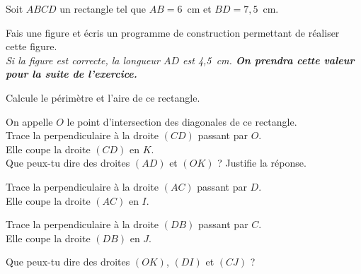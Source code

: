 Soit $ABCD$ un rectangle tel que $AB=6$~cm et $BD=7,5$~cm.
\begin{myenumerate}
\item Fais une figure et écris un programme de construction permettant
de réaliser cette figure.
\\{\em Si la figure est correcte, la longueur $AD$ est {\em 4,5~cm}. \bf
On prendra cette valeur pour la suite de l'exercice.}
\item Calcule le périmètre et l'aire de ce rectangle.
\item On appelle $O$ le point d'intersection des diagonales de ce
rectangle.\\ Trace la perpendiculaire à la droite $(CD)$ passant par
$O$.\\Elle coupe la droite $(CD)$ en $K$.\\ Que peux-tu dire des
droites $(AD)$ et $(OK)$ ? Justifie la réponse.
\item Trace la perpendiculaire à la droite $(AC)$ passant par
$D$.\\Elle coupe la droite $(AC)$ en $I$.
\item Trace la perpendiculaire à la droite $(DB)$ passant par
$C$.\\Elle coupe la droite $(DB)$ en $J$.
\item Que peux-tu dire des droites $(OK)$, $(DI)$ et $(CJ)$ ?
\end{myenumerate}